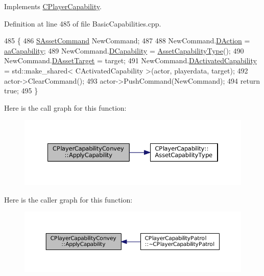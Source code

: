 Implements \hyperlink{classCPlayerCapability_a2ca6fd7fbd9c0178f1cf1d049c63825f}{C\+Player\+Capability}.



Definition at line 485 of file Basic\+Capabilities.\+cpp.


\begin{DoxyCode}
485                                                                                                            
                                                          \{
486     \hyperlink{structSAssetCommand}{SAssetCommand} NewCommand;
487     
488     NewCommand.\hyperlink{structSAssetCommand_a8edd3b3d59a76d5514ba403bc8076a75}{DAction} = \hyperlink{GameDataTypes_8h_ab47668e651a3032cfb9c40ea2d60d670acf9fb164e8abd71c71f4a8c7fda360d4}{aaCapability};
489     NewCommand.\hyperlink{structSAssetCommand_a734ea7c6847457b437360f333f570ff9}{DCapability} = \hyperlink{classCPlayerCapability_a433bb196cd6ab6a932f1cac102b3aa98}{AssetCapabilityType}();
490     NewCommand.\hyperlink{structSAssetCommand_a3d9b43f6e59c386c48c41a65448a0c39}{DAssetTarget} = target;
491     NewCommand.\hyperlink{structSAssetCommand_ad8beda19520811cc70fe1eab16c774dd}{DActivatedCapability} = std::make\_shared< CActivatedCapability >(actor, 
      playerdata, target);
492     actor->ClearCommand();
493     actor->PushCommand(NewCommand);
494     \textcolor{keywordflow}{return} \textcolor{keyword}{true};
495 \}
\end{DoxyCode}
Here is the call graph for this function\+:
\nopagebreak
\begin{figure}[H]
\begin{center}
\leavevmode
\includegraphics[width=350pt]{classCPlayerCapabilityConvey_ad05e5ab950872e685fb9449592f7f5a9_cgraph}
\end{center}
\end{figure}
Here is the caller graph for this function\+:
\nopagebreak
\begin{figure}[H]
\begin{center}
\leavevmode
\includegraphics[width=350pt]{classCPlayerCapabilityConvey_ad05e5ab950872e685fb9449592f7f5a9_icgraph}
\end{center}
\end{figure}
\hypertarget{classCPlayerCapabilityConvey_a795b3eb4c3879a6d7da1cba7962a1c78}{}\label{classCPlayerCapabilityConvey_a795b3eb4c3879a6d7da1cba7962a1c78} 
